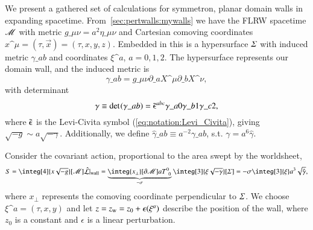 





\newcommand\hypsurf{\ALIAShypsurf}
\newcommand\pert{\ALIASpert}
\newcommand\sppt{\ALIASsppt}







We present a gathered set of calculations for symmetron, planar domain walls in expanding spacetime. From~\cref{sec:pertwalls:mywalls} we have the FLRW spacetime $\mathscr{M}$ with metric $g\_{\mu\nu}=a^2 \eta\_{\mu\nu}$ and Cartesian comoving coordinates $x\^\mu = (\tau, \vec{x})=(\tau, x,y,z)$. Embedded in this is a hypersurface $\hypsurf$ with induced metric $\gamma\_{ab}$ and coordinates $\xi\^a$, $a=0,1,2$. %
The hypersurface represents our domain wall, and the induced metric is
\begin{equation}
    \gamma\_{ab} = g\_{\mu\nu} \partial\_{a} X\^\mu \partial\_{b} X\^\nu,
\end{equation}
with determinant
\begin{equation}
    \gamma \equiv \det~\!(\gamma\_{ab}) = \tilde{\epsilonup}\^{abc}\gamma\_{a0}\gamma\_{b1}\gamma\_{c2},
\end{equation}
where $\tilde{\epsilonup}$ is the Levi-Civita symbol (\cref{eq:notation:Levi_Civita}), 
giving $\sqrt{-g}\sim a\sqrt{-\gamma}$. Additionally, we define $\hat{\gamma}\_{ab} \equiv a^{-2}\gamma\_{ab}$, s.t. $\gamma =a^6 \hat{\gamma}$.


Consider the covariant action, proportional to the area swept by the worldsheet,
\begin{equation}\label{eq:walls:covariant_action}
    S = \integ[4]{x\sqrt{-g}}[\Manifold] \hat{\mathcal{L}}\rvert\ped{wall} = \underbrace{\integ{x_\bot}[\partial \Manifold] aT\iud{0}{0}}_{-\sigma} \integ[3]{\xi \sqrt{-\gamma}}[\hypsurf] = -\sigma \integ[3]{\xi}a^3 \sqrt{\hat{\gamma}},
\end{equation}
where $x_\bot$ represents the comoving coordinate perpendicular to $\hypsurf$. %
We choose $\xi\^a = (\tau, x, y)$ and let $z=z\ped{w}=z_0 + \epsilon(\xi\^a)$ describe the position of the wall, where $z_0$ is a constant and $\epsilon$ is a linear perturbation. 

